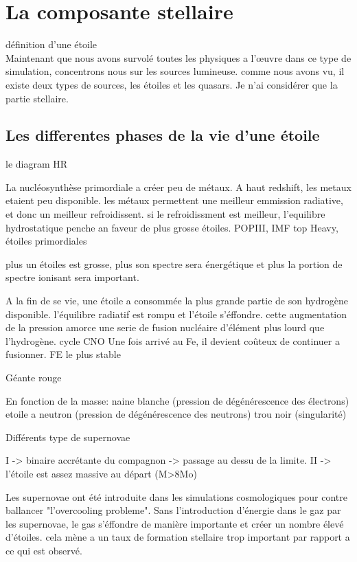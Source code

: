 \chapter{La composante stellaire}

définition d'une étoile\\

Maintenant que nous avons survolé toutes les physiques a l’œuvre dans ce type de simulation, concentrons nous sur les sources lumineuse.
comme nous avons vu, il existe deux types de sources, les étoiles et les quasars. %
Je n'ai considérer que la partie stellaire.



\section{Les differentes phases de la vie d'une étoile}

le diagram HR


La nucléosynthèse primordiale a créer peu de métaux. 
A haut redshift, les metaux etaient peu disponible.
les métaux permettent une meilleur emmission radiative, et donc un meilleur refroidissent.
si le refroidissment est meilleur, l'equilibre hydrostatique penche an faveur de plus grosse étoiles.
POPIII, IMF top Heavy, étoiles  primordiales

plus un étoiles est grosse, plus son spectre sera énergétique et plus la portion de spectre ionisant sera important.

A la fin de se vie, une étoile a consommée la plus grande partie de son hydrogène disponible.
l'équilibre radiatif est rompu et l'étoile s'éffondre.
cette augmentation de la pression amorce une serie de fusion nucléaire d’élément plus lourd que l’hydrogène.
cycle CNO
Une fois arrivé au Fe, il devient coûteux de continuer a fusionner.
FE le plus stable



Géante rouge

En fonction de la masse:
naine blanche (pression de dégénérescence des électrons)
etoile a neutron (pression de dégénérescence des neutrons)
trou noir (singularité)



Différents type de supernovae

I -> binaire accrétante du compagnon -> passage au dessu de la limite.
II -> l'étoile est assez massive au départ (M>8Mo)


Les supernovae ont été introduite dans les simulations cosmologiques pour contre ballancer "l'overcooling probleme".
Sans l'introduction d'énergie dans le gaz par les supernovae, le gas s'éffondre de manière importante et créer un nombre élevé d'étoiles.
cela mène a un taux de formation stellaire trop important par rapport a ce qui est observé.



